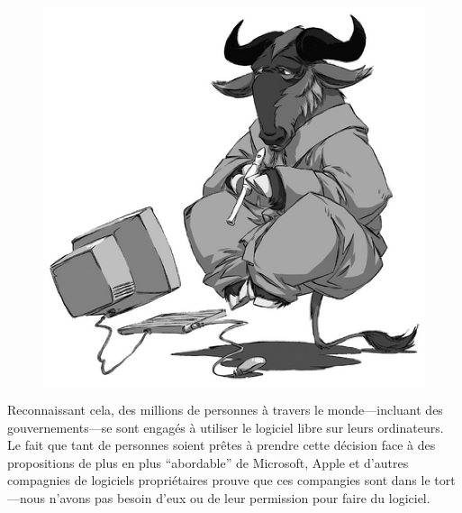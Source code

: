 \documentclass[twoside,12pt]{article}
\begin{document}
\begin{figure}
  \vspace{-0.25in}
  \begin{center}
    \includegraphics[scale=0.45]{gnu-think-smaller.eps}
  \end{center}
\end{figure}


Reconnaissant cela, des millions de personnes à travers le monde---incluant des gouvernements---se sont engagés à utiliser le logiciel libre sur leurs ordinateurs. Le fait que tant de personnes soient prêtes à prendre cette décision face à des propositions de plus en plus ``abordable'' de Microsoft, Apple et d'autres compagnies de logiciels propriétaires prouve que ces compangies sont dans le tort---nous n'avons pas besoin d'eux ou de leur permission pour faire du logiciel.

\end{document}
